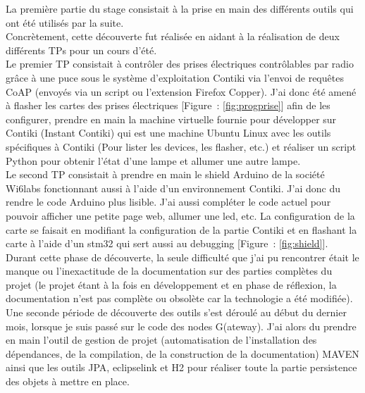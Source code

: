 \documentclass{article}
\begin{document}
La première partie du stage consistait à la prise en main des différents outils qui ont été utilisés par la suite.\\
Concrètement, cette découverte fut réalisée en aidant à la réalisation de deux différents TPs pour un cours d'été.\\
Le premier TP consistait à contrôler des prises électriques contrôlables par radio grâce à une puce sous le système d'exploitation Contiki via l'envoi de requêtes CoAP (envoyés via un script ou l'extension Firefox Copper). J'ai donc été amené à flasher les cartes des prises électriques [Figure~: \ref{fig:progprise}] afin de les configurer, prendre en main la machine virtuelle fournie pour développer sur Contiki (Instant Contiki) qui est une machine Ubuntu Linux avec les outils spécifiques à Contiki (Pour lister les devices, les flasher, etc.) et réaliser un script Python pour obtenir l'état d'une lampe et allumer une autre lampe.\\
Le second TP consistait à prendre en main le shield Arduino de la société Wi6labs fonctionnant aussi à l'aide d'un environnement Contiki. J'ai donc du rendre le code Arduino plus lisible. J'ai aussi compléter le code actuel pour pouvoir afficher une petite page web, allumer une led, etc. La configuration de la carte se faisait en modifiant la configuration de la partie Contiki et en flashant la carte à l'aide d'un stm32 qui sert aussi au debugging [Figure~: \ref{fig:shield}].\\
Durant cette phase de découverte, la seule difficulté que j'ai pu rencontrer était le manque ou l'inexactitude de la documentation sur des parties complètes du projet (le projet étant à la fois en développement et en phase de réflexion, la documentation n'est pas complète ou obsolète car la technologie a été modifiée).\\
Une seconde période de découverte des outils s'est déroulé au début du dernier mois, lorsque je suis passé sur le code des nodes G(ateway). J'ai alors du prendre en main l'outil de gestion de projet (automatisation de l'installation des dépendances, de la compilation, de la construction de la documentation) MAVEN ainsi que les outils JPA, eclipselink et H2 pour réaliser toute la partie persistence des objets à mettre en place.
\end{document}
